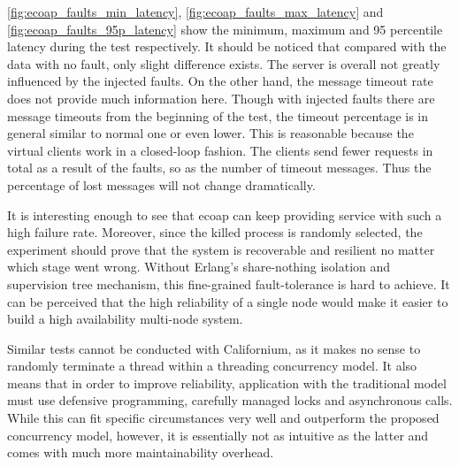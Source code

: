 \autoref{fig:ecoap_faults_min_latency}, \autoref{fig:ecoap_faults_max_latency} and \autoref{fig:ecoap_faults_95p_latency} show the minimum, maximum and 95 percentile latency during the test respectively. It should be noticed that compared with the data with no fault, only slight difference exists. The server is overall not greatly influenced by the injected faults. On the other hand, the message timeout rate does not provide much information here. Though with injected faults there are message timeouts from the beginning of the test, the timeout percentage is in general similar to normal one or even lower. This is reasonable because the virtual clients work in a closed-loop fashion. The clients send fewer requests in total as a result of the faults, so as the number of timeout messages. Thus the percentage of lost messages will not change dramatically.

It is interesting enough to see that ecoap can keep providing service with such a high failure rate. Moreover, since the killed process is randomly selected, the experiment should prove that the system is recoverable and resilient no matter which stage went wrong. Without Erlang's share-nothing isolation and supervision tree mechanism, this fine-grained fault-tolerance is hard to achieve. It can be perceived that the high reliability of a single node would make it easier to build a high availability multi-node system.

Similar tests cannot be conducted with Californium, as it makes no sense to randomly terminate a thread within a threading concurrency model. It also means that in order to improve reliability, application with the traditional model must use defensive programming, carefully managed locks and asynchronous calls. While this can fit specific circumstances very well and outperform the proposed concurrency model, however, it is essentially not as intuitive as the latter and comes with much more maintainability overhead. 




